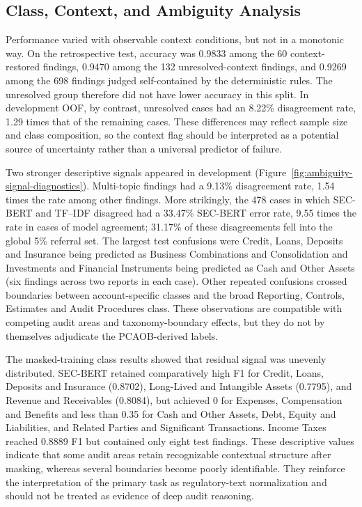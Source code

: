 \documentclass[11pt]{article}
\begin{document}
\subsection{Class, Context, and Ambiguity Analysis}

Performance varied with observable context conditions, but not in a monotonic way.
On the retrospective test, accuracy was 0.9833 among the 60 context-restored
findings, 0.9470 among the 132 unresolved-context findings, and 0.9269 among the
698 findings judged self-contained by the deterministic rules. The unresolved
group therefore did not have lower accuracy in this split. In development OOF,
by contrast, unresolved cases had an 8.22\% disagreement rate, 1.29 times that of
the remaining cases. These differences may reflect sample size and class
composition, so the context flag should be interpreted as a potential source of
uncertainty rather than a universal predictor of failure.

Two stronger descriptive signals appeared in development
(Figure~\ref{fig:ambiguity-signal-diagnostics}). Multi-topic findings
had a 9.13\% disagreement rate, 1.54 times the rate among other findings. More
strikingly, the 478 cases in which SEC-BERT and TF--IDF disagreed had a 33.47\%
SEC-BERT error rate, 9.55 times the rate in cases of model agreement; 31.17\% of
these disagreements fell into the global 5\% referral set. The largest test
confusions were Credit, Loans, Deposits and Insurance being predicted as Business
Combinations and Consolidation and Investments and Financial Instruments being
predicted as Cash and Other Assets (six findings across two reports in each case).
Other repeated confusions
crossed boundaries between account-specific classes and the broad Reporting,
Controls, Estimates and Audit Procedures class. These observations are compatible
with competing audit areas and taxonomy-boundary effects, but they do not by
themselves adjudicate the PCAOB-derived labels.

The masked-training class results showed that residual signal was unevenly
distributed. SEC-BERT retained comparatively high F1 for Credit, Loans, Deposits
and Insurance (0.8702), Long-Lived and Intangible Assets (0.7795), and Revenue
and Receivables (0.8084), but achieved 0 for Expenses, Compensation and Benefits
and less than 0.35 for Cash and Other Assets, Debt, Equity and Liabilities, and
Related Parties and Significant Transactions. Income Taxes reached 0.8889 F1 but
contained only eight test findings. These descriptive values indicate that some
audit areas retain recognizable contextual structure after masking, whereas
several boundaries become poorly identifiable. They reinforce the interpretation
of the primary task as regulatory-text normalization and should not be treated as
evidence of deep audit reasoning.
\end{document}
